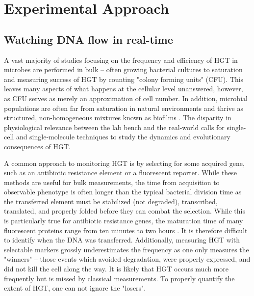 \section*{Experimental Approach} 
\subsection*{Watching DNA flow in real-time}
A vast majority of studies focusing on the frequency and efficiency of HGT in
microbes are performed in bulk -- often growing bacterial cultures to saturation
and measuring success of HGT by counting "colony forming units" (CFU). This leaves
many aspects of what happens at the cellular level unanswered, however, as CFU
serves as merely an approximation of cell number. In addition, microbial
populations are often far from saturation in natural
environments \cite{Vieira:2005jw, Whitman:1998tj} and thrive as structured,
non-homogeneous mixtures known as biofilms \cite{HallStoodley:2004cv}. The
disparity in physiological relevance between the lab bench and the real-world
calls for single-cell and single-molecule techniques to study the dynamics and
evolutionary consequences of HGT.

A common approach to monitoring HGT is by selecting for some acquired gene, such
as an antibiotic resistance element or a fluorescent reporter. While these
methods are useful for bulk measurements, the time from acquisition to
observable phenotype is often longer than the typical bacterial division time as
the transferred element must be stabilized (not degraded), transcribed,
translated, and properly folded before they can combat the selection. While this
is particularly true for antibiotic resistance genes, the maturation time of
many fluorescent proteins range from ten minutes to two
hours \cite{Iizuka:2011ia}. It is therefore difficult to identify when the DNA
was transferred. Additionally, measuring HGT with selectable markers grossly
underestimates the frequency as one only measures the "winners" -- those events
which avoided degradation, were properly expressed, and did not kill the cell
along the way.  It is likely that HGT occurs much more frequently but is missed
by classical measurements. To properly quantify the extent of HGT, one can not
ignore the "losers".

